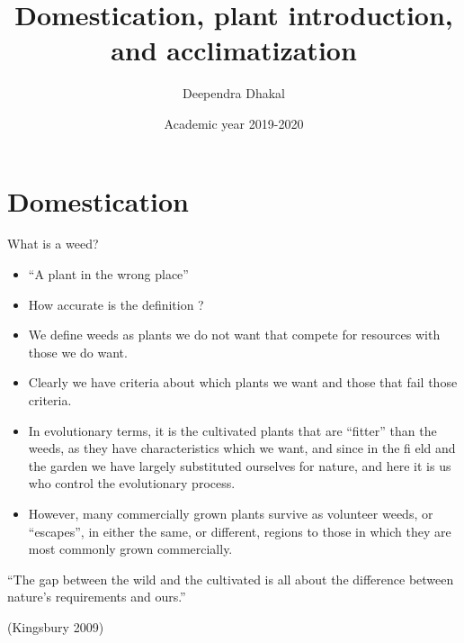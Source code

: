 \documentclass[11pt,ignorenonframetext,aspectratio=169]{beamer}
\title[]{Domestication, plant introduction, and acclimatization}
\author[
        Deependra Dhakal
    ]{Deependra Dhakal}
\institute[
    ]{
    Gokuleshwor Agriculture and Animal Science College\\
Tribhuwan University\\
\textit{ddhakal.rookie@gmail.com}\\
\url{https://rookie.rbind.io}
    }
\date[
      Academic year 2019-2020
  ]{
      Academic year 2019-2020
        }
\providecommand{\tightlist}{%
  \setlength{\itemsep}{0pt}\setlength{\parskip}{0pt}}
\begin{document}
  \begin{frame}[plain]
  \titlepage
  \end{frame}



\hypertarget{domestication}{%
\section{Domestication}\label{domestication}}

\begin{frame}{What is a weed?}
\protect\hypertarget{what-is-a-weed}{}
\begin{itemize}
\tightlist
\item
  ``A plant in the wrong place''
\item
  How accurate is the definition ?
\item
  We define weeds as plants we do not want that compete for resources
  with those we do want.
\item
  Clearly we have criteria about which plants we want and those that
  fail those criteria.
\item
  In evolutionary terms, it is the cultivated plants that are ``fitter''
  than the weeds, as they have characteristics which we want, and since
  in the fi eld and the garden we have largely substituted ourselves for
  nature, and here it is us who control the evolutionary process.
\item
  However, many commercially grown plants survive as volunteer weeds, or
  ``escapes'', in either the same, or different, regions to those in
  which they are most commonly grown commercially.
\end{itemize}
\end{frame}

\begin{frame}{}
\protect\hypertarget{section}{}
``The gap between the wild and the cultivated is all about the
difference between nature's requirements and ours.''

(Kingsbury 2009)
\end{frame}
\end{document}
